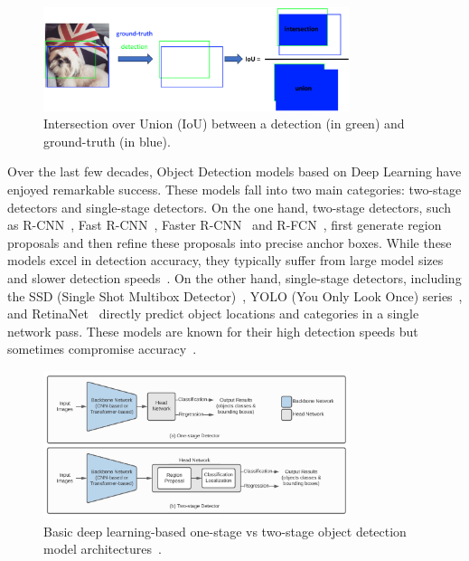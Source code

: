 \documentclass[12pt,oneside]{book} %
\begin{document}
\begin{figure}[H]
    \centering
    \includegraphics[width=0.8\textwidth]{figures/iou.png}
    \caption{Intersection over Union (IoU) between a detection (in green) and ground-truth (in blue).~\cite{huggingface2023objectdetection}}\label{fig:iou-metric}
\end{figure}

Over the last few decades, Object Detection models based on Deep Learning have
enjoyed remarkable success. These models fall into two main categories:
two-stage detectors and single-stage detectors. On the one hand, two-stage
detectors, such as R-CNN~\cite{DBLP:journals/corr/GirshickDDM13}, Fast
R-CNN~\cite{DBLP:journals/corr/Girshick15}, Faster R-CNN~\cite{Ren2017} and
R-FCN~\cite{DBLP:journals/corr/DaiLHS16}, first generate region proposals and
then refine these proposals into precise anchor boxes. While these models excel
in detection accuracy, they typically suffer from large model sizes and slower
detection speeds~\cite{SurveyDLOD, ODNetworkUAVCNNTransformer}. On the other
hand, single-stage detectors, including the SSD (Single Shot Multibox
Detector)~\cite{DBLP:journals/corr/LiuAESR15}, YOLO (You Only Look Once)
series~\cite{DBLP:journals/corr/RedmonDGF15, DBLP:journals/corr/RedmonF16,
    DBLP:journals/corr/abs-2004-10934, chen2023yoloms,
    DBLP:journals/corr/abs-2107-08430, YOLOv5Release, li2023yolov6, YOLOv8,
    wang2024yolov9, xu2022ppyoloe, wang2023goldyolo, xu2023damoyolo,
    wang2024yolov10}, and RetinaNet~\cite{lin2018focal} directly predict object
locations and categories in a single network pass. These models are known for
their high detection speeds but sometimes compromise accuracy~\cite{SurveyDLOD,
    ODNetworkUAVCNNTransformer}.

\begin{figure}[H]
    \centering
    \includegraphics[width=0.8\textwidth]{figures/one-stage_two-stage_OD.png}
    \caption{Basic deep learning-based one-stage vs two-stage object detection model architectures~\cite{SurveyDLOD}.}\label{fig:two-stage-vs-single-stage}
\end{figure}
\end{document}
